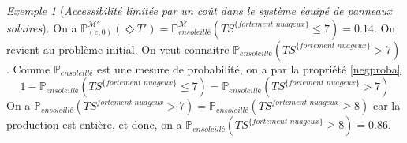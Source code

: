 \documentclass[12pt,a4paper]{report}
\theoremstyle{definition}%
\theoremstyle{remark}
\newtheorem{example}{Exemple}[chapter]
\newcommand{\ie}{i.e., }
\newcommand{\cf}{cf. }
\newcommand{\pr}{\mathbb{P}}
\begin{document}
\begin{example}[\textit{Accessibilité limitée par un coût dans le système équipé de panneaux solaires}]
On a $\pr^{\mathcal{M'}}_{(e, 0)} (\Diamond T') = \pr^\mathcal{M}_{\textit{ensoleillé}}(TS^{\{ \textit{fortement nuageux} \}} \leq 7) = 0.14$. On revient au problème initial. On veut connaitre $\pr_{\textit{ensoleillé}}(TS^{\{ \textit{fortement nuageux} \}} > 7)$. Comme $\pr_{\textit{ensoleillé}}$ est une mesure de probabilité, on a par la propriété \ref{negproba} \[1 - \pr_{\textit{ensoleillé}}(TS^{\{ \textit{fortement nuageux} \}} \leq 7) = \pr_{\textit{ensoleillé}}(TS^{\{ \textit{fortement nuageux} \}} > 7)\]
On a $\pr_{\textit{ensoleillé}}(TS^{\textit{fortement nuageux}} > 7) =
\pr_{\textit{ensoleillé}}(TS^{\textit{fortement nuageux}} \geq 8)$ car la production est entière,
et donc, on a $\pr_{\textit{ensoleillé}}(TS^{\{ \textit{fortement nuageux} \}} \geq 8) = 0.86$.
\end{example}

%
%
%
\end{document}
